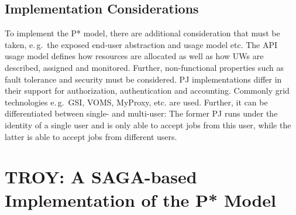 \documentclass[conference,final]{IEEEtran}
\newcommand{\jhanote}[1]{ {\textcolor{red} { ***shantenu: #1 }}}
\newcommand{\msnote}[1]{ {\textcolor{cyan} { ***mark: #1 }}}
\newcommand{\jhanote}[1]{}
\newcommand{\msnote}[1]{}
\begin{document}
\subsection{Implementation Considerations}




To implement the P* model, there are additional consideration that must be
taken, e.\,g.\ the exposed end-user abstraction and usage model etc. The API
usage model defines how resources are allocated as well as how UWs are
described, assigned and monitored. Further, non-functional properties such as
fault tolerance and security must be considered. PJ implementations differ in
their support for authorization, authentication and accounting. Commonly grid
technologies e.\,g.\ GSI, VOMS, MyProxy, etc. are used. Further, it can be
differentiated between single- and multi-user: The former PJ runs under the
identity of a single user and is only able to accept jobs from this user, while
the latter is able to accept jobs from different users.


	



\section{TROY: A SAGA-based Implementation of the P* Model}


\end{document}
